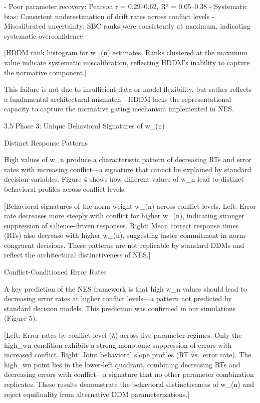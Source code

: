 - Poor parameter recovery: Pearson r = 0.29–0.62, R² = 0.05–0.38
- Systematic bias: Consistent underestimation of drift rates across
  conflict levels
- Miscalibrated uncertainty: SBC ranks were consistently at maximum,
  indicating systematic overconfidence

[HDDM rank histogram for w_(n) estimates. Ranks clustered at the maximum
value indicate systematic miscalibration, reflecting HDDM’s inability to
capture the normative component.]

This failure is not due to insufficient data or model flexibility, but
rather reflects a fundamental architectural mismatch—HDDM lacks the
representational capacity to capture the normative gating mechanism
implemented in NES.

3.5 Phase 3: Unique Behavioral Signatures of w_(n)

Distinct Response Patterns

High values of w_n produce a characteristic pattern of decreasing RTs
and error rates with increasing conflict—a signature that cannot be
explained by standard decision variables. Figure 4 shows how different
values of w_n lead to distinct behavioral profiles across conflict
levels.

[Behavioral signatures of the norm weight w_(n) across conflict levels.
Left: Error rate decreases more steeply with conflict for higher w_(n),
indicating stronger suppression of salience-driven responses. Right:
Mean correct response times (RTs) also decrease with higher w_(n),
suggesting faster commitment in norm-congruent decisions. These patterns
are not replicable by standard DDMs and reflect the architectural
distinctiveness of NES.]

Conflict-Conditioned Error Rates

A key prediction of the NES framework is that high w_n values should
lead to decreasing error rates at higher conflict levels—a pattern not
predicted by standard decision models. This prediction was confirmed in
our simulations (Figure 5).

[Left: Error rates by conflict level (λ) across five parameter regimes.
Only the high_wn condition exhibits a strong monotonic suppression of
errors with increased conflict. Right: Joint behavioral slope profiles
(RT vs. error rate). The high_wn point lies in the lower-left quadrant,
combining decreasing RTs and decreasing errors with conflict—a signature
that no other parameter combination replicates. These results
demonstrate the behavioral distinctiveness of w_(n) and reject
equifinality from alternative DDM parameterizations.]

